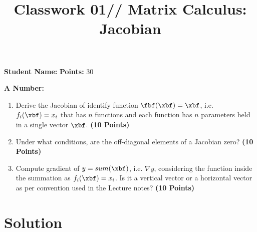 \documentclass[12pt, xcolor=dvipsnames,svgnames,x11names]{article}
\makeatletter
\renewcommand{\maketitle}{%
    \vspace*{0.2cm}
    \begin{center}
        \begin{tcolorbox}[
            enhanced,
            colback=white,
            colframe=headerRed,
            arc=0mm,
            title={\textcolor{white}{\bfseries \@title}},
            coltitle=white,
            fonttitle=\bfseries\large,
            attach boxed title to top left={xshift=10pt, yshift=-\tcboxedtitleheight/2},
            boxed title style={sharp corners, colback=headerRed, frame hidden}
        ]
        \large
        \vspace{10pt}
        \noindent \textbf{Student Name:} \underline{\hspace{7cm}} \hfill \textbf{Points:} 30
        
        \vspace{10pt}
        \noindent \textbf{A Number:} \underline{\hspace{11cm}}
        \end{tcolorbox}
    \end{center}
    \vspace{10pt}
}
\newcommand{\hw}{Classwork 01// Matrix Calculus: Jacobian}
\makeatother
\begin{document}
\title{\hw}
\maketitle


\begin{enumerate}
\item Derive the Jacobian of identify function $\fbf(\xbf) = \xbf $, i.e. $f_i(\xbf) = x_i$ that has $n$ functions and each function has $n$ parameters held in a single vector $\xbf$. \hfill \textbf{(10 Points)}

\item Under what conditions, are the off-diagonal elements of a Jacobian zero? \hfill \textbf{(10 Points)}

\item Compute gradient of $y = sum(\xbf)$, i.e. $\nabla y $, considering the function inside the summation as $f_i(\xbf) =  x_i$. Is it a vertical vector or a horizontal vector as per convention used in the Lecture notes? \hfill \textbf{(10 Points)}

\end{enumerate}


\section*{Solution}
\end{document}
